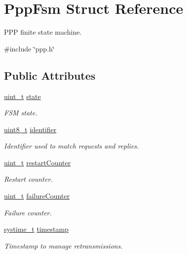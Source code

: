 \hypertarget{structPppFsm}{}\section{Ppp\+Fsm Struct Reference}
\label{structPppFsm}


P\+PP finite state machine.  




{\ttfamily \#include \char`\"{}ppp.\+h\char`\"{}}

\subsection*{Public Attributes}
\begin{DoxyCompactItemize}
\item 
\hyperlink{compiler__port_8h_a12a1e9b3ce141648783a82445d02b58d}{uint\+\_\+t} \hyperlink{structPppFsm_ac5031e0c5bb00a8604a2cd1f3616c948}{state}
\begin{DoxyCompactList}\small\item\em F\+SM state. \end{DoxyCompactList}\item 
\hyperlink{stdint_8h_aba7bc1797add20fe3efdf37ced1182c5}{uint8\+\_\+t} \hyperlink{structPppFsm_a9920460a6f4ed8ccd264f87ce18bca01}{identifier}
\begin{DoxyCompactList}\small\item\em Identifier used to match requests and replies. \end{DoxyCompactList}\item 
\hyperlink{compiler__port_8h_a12a1e9b3ce141648783a82445d02b58d}{uint\+\_\+t} \hyperlink{structPppFsm_a20a9aac97e60dc38126906103e421c26}{restart\+Counter}
\begin{DoxyCompactList}\small\item\em Restart counter. \end{DoxyCompactList}\item 
\hyperlink{compiler__port_8h_a12a1e9b3ce141648783a82445d02b58d}{uint\+\_\+t} \hyperlink{structPppFsm_af1f05d99c0681de3a2c025b676f62bc1}{failure\+Counter}
\begin{DoxyCompactList}\small\item\em Failure counter. \end{DoxyCompactList}\item 
\hyperlink{compiler__port_8h_ae3e32a98d431a02106616da3071832dd}{systime\+\_\+t} \hyperlink{structPppFsm_a6326e54dca1a758a4d62a92ef9858b19}{timestamp}
\begin{DoxyCompactList}\small\item\em Timestamp to manage retransmissions. \end{DoxyCompactList}\end{DoxyCompactItemize}


